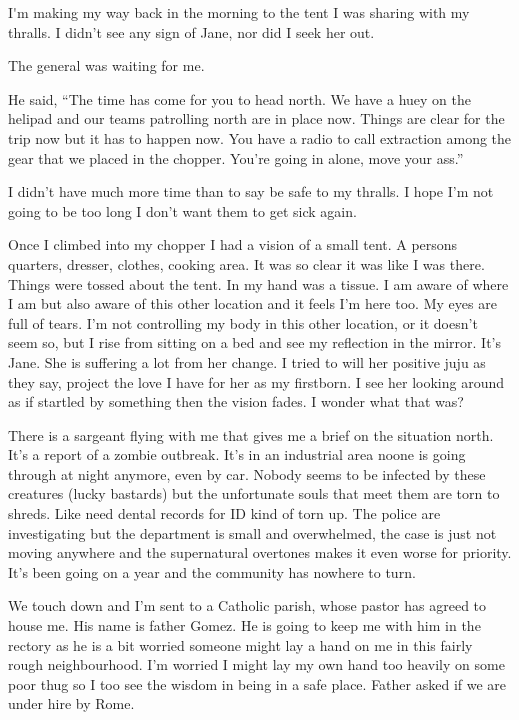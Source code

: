 \lettrine[lines=2,lraise=0]{I}'m making my way back in the morning to the tent I was sharing with my thralls. I didn't see any sign of Jane, nor did I seek her out. 



The general was waiting for me.

He said, ``The time has come for you to head north. We have a huey on the helipad and our teams patrolling north are in place now. Things are clear for the trip now but it has to happen now. You have a radio to call extraction among the gear that we placed in the chopper. You're going in alone, move your ass.''

I didn't have much more time than to say be safe to my thralls. I hope I'm not going to be too long I don't want them to get sick again.

Once I climbed into my chopper I had a vision of a small tent. A persons quarters, dresser, clothes, cooking area. It was so clear it was like I was there. Things were tossed about the tent. In my hand was a tissue. I am aware of where I am but also aware of this other location and it feels I'm here too. My eyes are full of tears. I'm not controlling my body in this other location, or it doesn't seem so, but I rise from sitting on a bed and see my reflection in the mirror. It's Jane. She is suffering a lot from her change. I tried to will her positive juju as they say, project the love I have for her as my firstborn. I see her looking around as if startled by something then the vision fades. I wonder what that was?

There is a sargeant flying with me that gives me a brief on the situation north. It's a report of a zombie outbreak. It's in an industrial area noone is going through at night anymore, even by car. Nobody seems to be infected by these creatures (lucky bastards) but the unfortunate souls that meet them are torn to shreds. Like need dental records for ID kind of torn up. The police are investigating but the department is small and overwhelmed, the case is just not moving anywhere and the supernatural overtones makes it even worse for priority. It's been going on a year and the community has nowhere to turn.

\parasep

We touch down and I'm sent to a Catholic parish, whose pastor has agreed to house me. His name is father Gomez. He is going to keep me with him in the rectory as he is a bit worried someone might lay a hand on me in this fairly rough neighbourhood. I'm worried I might lay my own hand too heavily on some poor thug so I too see the wisdom in being in a safe place. Father asked if we are under hire by Rome. 

